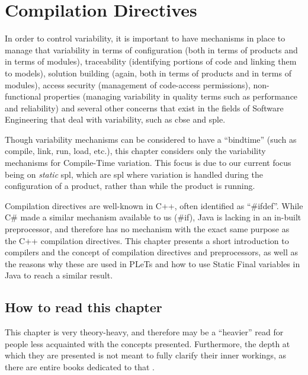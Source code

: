 \chapter{Compilation Directives}
\label{ch:staticfinal}

In order to control variability, it is important to have mechanisms in place to manage that variability in terms of configuration (both in terms of products and in terms of modules), traceability (identifying portions of code and linking them to models), solution building (again, both in terms of products and in terms of modules), access security (management of code-access permissions), non-functional properties (managing variability in quality terms such as performance and reliability) and several other concerns that exist in the fields of Software Engineering that deal with variability, such as \acrfull{cbse} and \acrfull{sple}.

Though variability mechanisms can be considered to have a ``\gls{bindtime}'' (such as compile, link, run, load, etc.), this chapter considers only the variability mechanisms for Compile-Time variation. This focus is due to our current focus being on \emph{static} \acrshort{spl}, which are \acrshort{spl} where variation is handled during the configuration of a product, rather than while the product is running.

Compilation directives are well-known in C++, often identified as ``\#ifdef''. While C\# made a similar mechanism available to us (\#if), Java is lacking in an in-built preprocessor, and therefore has no mechanism with the exact same purpose as the C++ compilation directives. This chapter presents a short introduction to compilers and the concept of compilation directives and preprocessors, as well as the reasons why these are used in PLeTs and how to use Static Final variables in Java to reach a similar result.


\section*{How to read this chapter}

This chapter is very theory-heavy, and therefore may be a ``heavier'' read for people less acquainted with the concepts presented. Furthermore, the depth at which they are presented is not meant to fully clarify their inner workings, as there are entire books dedicated to that \cite{AHO:2006} \cite{CZARNECKI:2000}.

